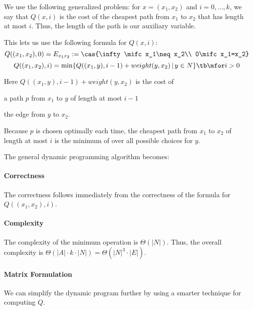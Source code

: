 We use the following generalized problem: for $x=(x_1,x_2)$ and $i=0,\ldots,k$, we say that $Q(x,i)$ is the cost of the cheapest path from $x_1$ to $x_2$ that has length at most $i$.
Thus, the length of the path is our auxiliary variable.

This lets us use the following formula for $Q(x,i)$:
\[Q((x_1,x_2),0)=E_{x_1x_2}:=\cas{\infty \mifc x_1\neq x_2\\ 0\mifc x_1=x_2}\]
\[Q((x_1,x_2),i)=\min \{Q((x_1,y),i-1)+weight(y,x_2)\,|\,y\in N\} \tb\mfor i>0\]

Here $Q((x_1,y),i-1)+weight(y,x_2)$ is the cost of
\begin{compactitem}
 \item a path $p$ from $x_1$ to $y$ of length at most $i-1$
 \item the edge from $y$ to $x_2$.
\end{compactitem}
Because $p$ is chosen optimally each time, the cheapest path from $x_1$ to $x_2$ of length at most $i$ is the minimum of over all possible choices for $y$.

The general dynamic programming algorithm becomes:

\begin{acode}
\end{acode}

\paragraph{Correctness}
The correctness follows immediately from the correctness of the formula for $Q((x_1,x_2),i)$.

\paragraph{Complexity}
The complexity of the minimum operation is $\Theta(|N|)$.
Thus, the overall complexity is $\Theta(|A|\cdot k\cdot |N|)= \Theta(|N|^3\cdot |E|)$.

\paragraph{Matrix Formulation}
We can simplify the dynamic program further by using a smarter technique for computing $Q$.

